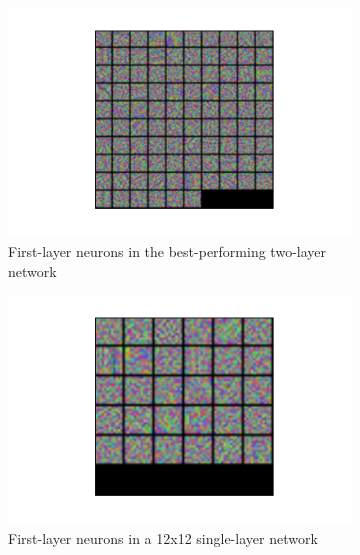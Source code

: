 \documentclass[10pt]{article}
\begin{document}
\begin{figure}[!ht]
\centering
\begin{subfigure}[t]{0.3\textwidth}
	\centering
	\includegraphics[width=\textwidth]{12_6_best_iter_100000.pdf}
	\caption{First-layer neurons in the best-performing two-layer network}
	\label{fig:12_6_3}
\end{subfigure}
\hspace{3mm}
\begin{subfigure}[t]{0.288\textwidth}
	\centering
	\includegraphics[width=\textwidth]{12_kernel_3_kernel_2_dropout_10000_30_each_1e3_iter_90000.pdf}
	\caption{First-layer neurons in a 12x12 single-layer network}
	\label{fig:12}
\end{subfigure}
\hspace{3mm}
\begin{subfigure}[t]{0.288\textwidth}
	\centering

\end{subfigure}
\end{figure}
\end{document}
